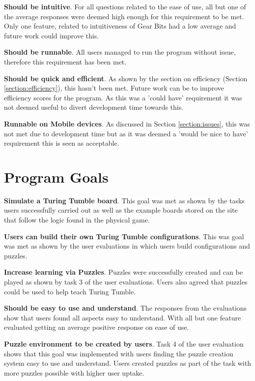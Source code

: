 \documentclass{l4proj}
\begin{document}
\textbf{Should be intuitive}. For all questions related to the ease of use, all but one of the average responses were deemed high enough for this requirement to be met. Only one feature, related to intuitiveness of Gear Bits had a low average and future work could improve this. 

\textbf{Should be runnable}. All users managed to run the program without issue, therefore this requirement has been met.

\textbf{Should be quick and efficient}. As shown by the section on efficiency (Section \ref{section:efficiency}), this hasn't been met. Future work can be to improve efficiency scores for the program. As this was a 'could have' requirement it was not deemed useful to divert development time towards this. 

\textbf{Runnable on Mobile devices}. As discussed in Section \ref{section:issues}, this was not met due to development time but as it was deemed a 'would be nice to have' requirement this is seen as acceptable. 

\section{Program Goals}

\textbf{Simulate a Turing Tumble board}. This goal was met as shown by the tasks users successfully carried out as well as the example boards stored on the site that follow the logic found in the physical game.

\textbf{Users can build their own Turing Tumble configurations}. This was goal was met as shown by the user evaluations in which users build configurations and puzzles.

\textbf{Increase learning via Puzzles}. Puzzles were successfully created and can be played as shown by task 3 of the user evaluations. Users also agreed that puzzles could be used to help teach Turing Tumble.

\textbf{Should be easy to use and understand}. The responses from the evaluations show that users found all aspects easy to understand. With all but one feature evaluated getting an average positive response on ease of use. 

\textbf{Puzzle environment to be created by users}. Task 4 of the user evaluation shows that this goal was implemented with users finding the puzzle creation system easy to use and understand. Users created puzzles as part of the task with more puzzles possible with higher user uptake. 
\end{document}
